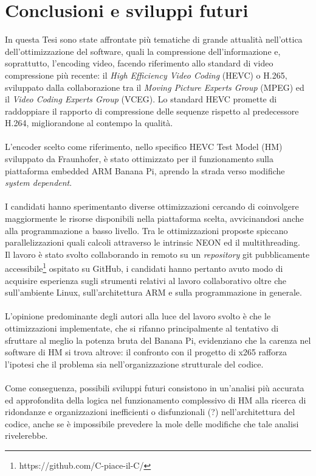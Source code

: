 
\chapter{Conclusioni e sviluppi futuri} %
In questa Tesi sono state affrontate più tematiche di grande attualità  
nell'ottica dell'ottimizzazione del software, quali la compressione 
dell'informazione e, soprattutto, l'encoding video, facendo riferimento allo 
standard di 
video 
compressione più recente: il 
\emph{High Efficiency Video Coding} (HEVC) o H.265, sviluppato dalla 
collaborazione tra il \emph{Moving Picture Experts Group} (MPEG) ed il 
\emph{Video Coding Experts Group} (VCEG). Lo standard HEVC promette di 
raddoppiare il 
rapporto di compressione delle sequenze rispetto al predecessore H.264, 
migliorandone al contempo la qualità.\\ \\
L'encoder scelto come riferimento, nello specifico HEVC Test 
Model (HM) sviluppato da Fraunhofer, è stato ottimizzato per il 
funzionamento sulla piattaforma embedded ARM Banana Pi, aprendo la strada verso 
modifiche \emph{system dependent}.\\ \\
I candidati hanno sperimentanto diverse ottimizzazioni cercando di coinvolgere 
maggiormente le risorse disponibili nella piattaforma scelta, avvicinandosi 
anche alla programmazione a basso livello. Tra le ottimizzazioni proposte 
spiccano 
parallelizzazioni 
quali calcoli attraverso le intrinsic NEON ed il multithreading. \\
Il lavoro è stato svolto collaborando in remoto su un \emph{repository} 
git pubblicamente accessibile\footnote{https://github.com/C-piace-il-C/} 
ospitato su GitHub, i candidati 
hanno pertanto avuto modo di acquisire esperienza sugli strumenti relativi al 
lavoro collaborativo oltre che sull'ambiente Linux, sull'architettura ARM e 
sulla programmazione in generale.\\ \\
L'opinione predominante degli autori alla luce del lavoro svolto è che le 
ottimizzazioni implementate, che si rifanno principalmente al tentativo di 
sfruttare al meglio la potenza bruta del Banana Pi, evidenziano che la carenza 
nel software di HM si trova altrove: il confronto con il progetto di x265 
rafforza l'ipotesi che il problema sia nell'organizzazione strutturale del 
codice.\\ \\
Come conseguenza, possibili sviluppi futuri consistono in un'analisi più 
accurata ed approfondita della logica nel funzionamento complessivo di HM alla 
ricerca di ridondanze e organizzazioni inefficienti o  
disfunzionali (?) nell'architettura del codice, anche se è impossibile 
prevedere la mole delle modifiche che tale analisi rivelerebbe.
\label{Chapter8} %

